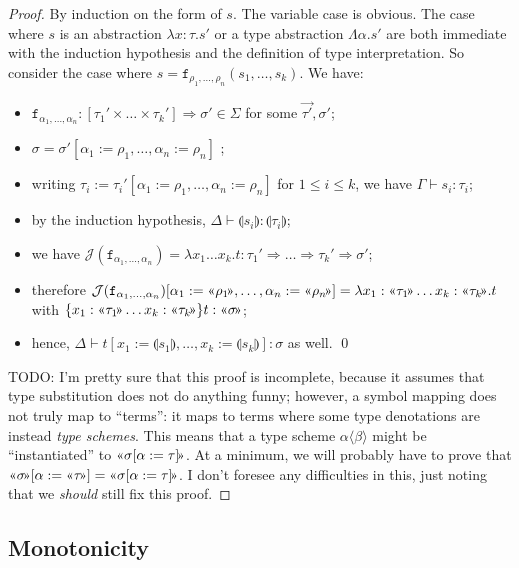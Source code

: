 \documentclass[runningheads,a4paper]{llncs}
\newcommand{\Termmap}{\mathcal{J}}
\newcommand{\typeinterpret}[1]{\text{\guillemotleft} #1\! \text{\guillemotright}}
\newcommand{\interpret}[1]{\llparenthesis #1 \rrparenthesis}
\newcommand{\arrtype}{\Rightarrow}
\newcommand{\abs}[2]{\lambda #1.#2}
\newcommand{\tabs}[2]{\Lambda #1.#2}
\newcommand{\afun}{\mathtt{f}}
\begin{document}
\begin{proof}
By induction on the form of $s$.
The variable case is obvious.
The case where $s$ is an abstraction $\abs{x:\tau}{s'}$ or a type
abstraction $\tabs{\alpha}{s'}$ are both immediate with the induction
hypothesis and the definition of type interpretation.
So consider the case where $s = \afun_{\rho_1,\dots,\rho_n}(s_1,\dots,
s_k)$.  We have:
\begin{itemize}
\item $\afun_{\alpha_1,\dots,\alpha_n} : [\tau_1' \times \dots \times
  \tau_k'] \arrtype \sigma' \in \Sigma$ for some $\vec{\tau'},\sigma'$;
\item $\sigma = \sigma'[\alpha_1:=\rho_1,\dots,\alpha_n:=\rho_n]$ ;
\item writing $\tau_i := \tau_i'[\alpha_1:=\rho_1,\dots,\alpha_n:=
  \rho_n]$ for $1 \leq i \leq k$, we have $\Gamma \vdash s_i : \tau_i$;
\item by the induction hypothesis, $\Delta \vdash \interpret{s_i} :
  \interpret{\tau_i}$;
\item we have $\Termmap(\afun_{\alpha_1,\dots,\alpha_n}) =
  \abs{x_1 \dots x_k}{t} : \tau_1' \arrtype \dots \arrtype \tau_k'
  \arrtype \sigma'$;
\item therefore $\Termmap(\afun_{\alpha_1,\dots,\alpha_n})[\alpha_1:=
  \typeinterpret{\rho_1},\dots,\alpha_n:=\typeinterpret{\rho_n}] =
  \abs{x_1: \typeinterpret{\tau_1} \dots x_k : \typeinterpret{\tau_k}}{
  t}$ with $\{ x_1: \typeinterpret{\tau_1} \dots x_k :
  \typeinterpret{\tau_k} \} t : \typeinterpret{\sigma}$;
\item hence, $\Delta \vdash t[x_1:=\interpret{s_1},\dots,x_k:=
  \interpret{s_k}] : \sigma$ as well.
\qed
\end{itemize}

TODO: I'm pretty sure that this proof is incomplete, because it assumes
that type substitution does not do anything funny; however, a symbol
mapping does not truly map to ``terms'': it maps to terms where some
type denotations are instead \emph{type schemes}.  This means that a
type scheme $\alpha\langle\beta\rangle$ might be ``instantiated'' to
$\typeinterpret{\sigma[\alpha:=\tau]}$.  At a minimum, we will probably
have to prove that $\typeinterpret{\sigma}[\alpha:=\typeinterpret{\tau}
] = \typeinterpret{\sigma[\alpha:=\tau]}$.  I don't foresee any
difficulties in this, just noting that we \emph{should} still fix this
proof.
\end{proof}

\subsection{Monotonicity}
\end{document}

